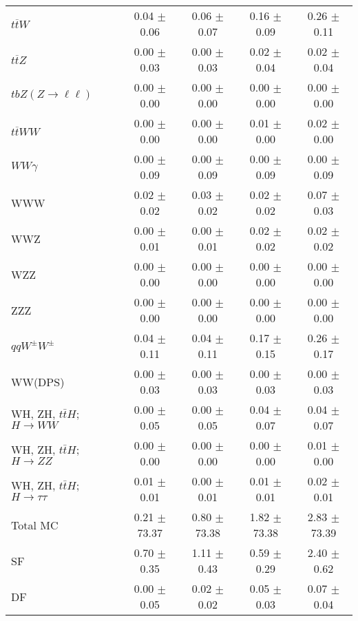 \begin{tabular}{l|cccc}
                   $t\overline{t}W$ &  0.04 $\pm$  0.06 &  0.06 $\pm$  0.07 &  0.16 $\pm$  0.09 &  0.26 $\pm$  0.11 \\
                   $t\overline{t}Z$ &  0.00 $\pm$  0.03 &  0.00 $\pm$  0.03 &  0.02 $\pm$  0.04 &  0.02 $\pm$  0.04 \\
    $tbZ (Z \rightarrow \ell \ell)$ &  0.00 $\pm$  0.00 &  0.00 $\pm$  0.00 &  0.00 $\pm$  0.00 &  0.00 $\pm$  0.00 \\
                  $t\overline{t}WW$ &  0.00 $\pm$  0.00 &  0.00 $\pm$  0.00 &  0.01 $\pm$  0.00 &  0.02 $\pm$  0.00 \\
                         $WW\gamma$ &  0.00 $\pm$  0.09 &  0.00 $\pm$  0.09 &  0.00 $\pm$  0.09 &  0.00 $\pm$  0.09 \\
                                WWW &  0.02 $\pm$  0.02 &  0.03 $\pm$  0.02 &  0.02 $\pm$  0.02 &  0.07 $\pm$  0.03 \\
                                WWZ &  0.00 $\pm$  0.01 &  0.00 $\pm$  0.01 &  0.02 $\pm$  0.02 &  0.02 $\pm$  0.02 \\
                                WZZ &  0.00 $\pm$  0.00 &  0.00 $\pm$  0.00 &  0.00 $\pm$  0.00 &  0.00 $\pm$  0.00 \\
                                ZZZ &  0.00 $\pm$  0.00 &  0.00 $\pm$  0.00 &  0.00 $\pm$  0.00 &  0.00 $\pm$  0.00 \\
                 $qqW^{\pm}W^{\pm}$ &  0.04 $\pm$  0.11 &  0.04 $\pm$  0.11 &  0.17 $\pm$  0.15 &  0.26 $\pm$  0.17 \\
                            WW(DPS) &  0.00 $\pm$  0.03 &  0.00 $\pm$  0.03 &  0.00 $\pm$  0.03 &  0.00 $\pm$  0.03 \\
WH, ZH, $t\bar{t}H$; $H \rightarrow WW$ &  0.00 $\pm$  0.05 &  0.00 $\pm$  0.05 &  0.04 $\pm$  0.07 &  0.04 $\pm$  0.07 \\
WH, ZH, $t\bar{t}H$; $H \rightarrow ZZ$ &  0.00 $\pm$  0.00 &  0.00 $\pm$  0.00 &  0.00 $\pm$  0.00 &  0.01 $\pm$  0.00 \\
WH, ZH, $t\bar{t}H$; $H \rightarrow \tau\tau$ &  0.01 $\pm$  0.01 &  0.00 $\pm$  0.01 &  0.01 $\pm$  0.01 &  0.02 $\pm$  0.01 \\
\hline\hline
                           Total MC &  0.21 $\pm$ 73.37 &  0.80 $\pm$ 73.38 &  1.82 $\pm$ 73.38 &  2.83 $\pm$ 73.39 \\
\hline
                                 SF &  0.70 $\pm$  0.35 &  1.11 $\pm$  0.43 &  0.59 $\pm$  0.29 &  2.40 $\pm$  0.62 \\
                                 DF &  0.00 $\pm$  0.05 &  0.02 $\pm$  0.02 &  0.05 $\pm$  0.03 &  0.07 $\pm$  0.04 \\

\end{tabular}
